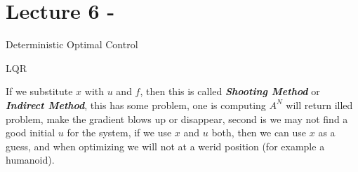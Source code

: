 \documentclass[10pt]{elegantbook}
\newcommand{\mydefination}[1]{\textbf{\textit{\textcolor{structurecolor}{#1}}}}
\begin{document}
\section{Lecture 6 - }

\begin{introduction}
    \item Deterministic Optimal Control
    \item LQR
\end{introduction}

If we substitute $x$ with $u$ and $f$, then this is called \mydefination{Shooting Method} or \mydefination{Indirect Method},
this has some problem, one is computing $A^N$ will return illed problem, make the gradient blows up or disappear, second is
we may not find a good initial $u$ for the system, if we use $x$ and $u$ both, then we can use $x$ as a guess, and when
optimizing we will not at a werid position (for example a humanoid).
\end{document}
